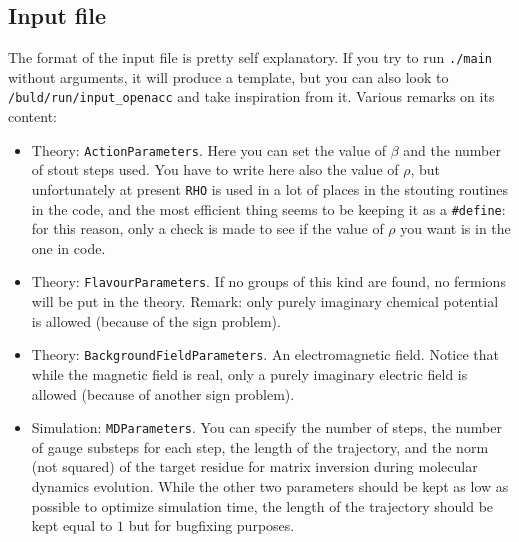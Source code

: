 \subsection{Input file}
The format of the input file is pretty self explanatory. If you try
to run \verb|./main| without arguments, it will produce a template, but
you can also look to \verb|/buld/run/input_openacc| and take inspiration from 
it. Various remarks on its content:

\begin{itemize}
    \item{Theory: \verb|ActionParameters|.}
        Here you can set the value of $\beta$ and the number of stout steps used. You 
        have to write here also the value of $\rho$, but unfortunately at present 
        \verb|RHO| is used in a lot of places in the stouting routines in the code, and 
        the most efficient thing seems to be keeping it as a \verb|#define|: for this 
        reason, only a check is made to see if the value of $\rho$ you want is in 
        the one in code.
    \item{Theory: \verb|FlavourParameters|.}
        If no groups of this kind are found, no fermions will be put in the theory.
        Remark: only purely imaginary chemical potential is allowed (because of the 
        sign problem). 
    \item{Theory: \verb|BackgroundFieldParameters|.}
        An electromagnetic field. Notice that while the magnetic field is real, only 
        a purely imaginary electric field is allowed (because of another sign problem).
    \item{Simulation: \verb|MDParameters|.} You can specify the number of steps, 
        the number of gauge substeps for each step, the length of the trajectory, and 
        the norm (not squared) of the target residue for matrix inversion during 
        molecular dynamics evolution. While the other two parameters should be kept as 
        low as possible to optimize simulation time, the length of the trajectory 
        should be kept equal to $1$ but for bugfixing purposes.


\end{itemize}
